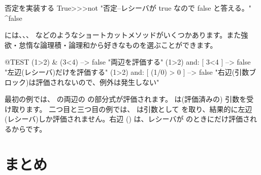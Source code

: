 \documentclass[a4paper,10pt,twoside]{book}
\begin{document}
\begin{method}{否定を実装する}
True>>>not
    "否定--レシーバが true なので false と答える。"
    ^false
\end{method}

 には、、、 などのようなショートカットメソッドがいくつかあります。また強欲・怠惰な論理積・論理和から好きなものを選ぶことができます。

\begin{code}{@TEST}
(1>2) & (3<4)              --> false    "両辺を評価する"
(1>2) and: [ 3<4 ]        --> false    "左辺(レシーバ)だけを評価する"
(1>2) and: [ (1/0) > 0 ] --> false    "右辺(引数ブロック)は評価されないので、例外は発生しない"
\end{code}

最初の例では、 の両辺の  の部分式が評価されます。\ct{&} は(評価済みの)  引数を受け取ります。
二つ目と三つ目の例では、 は引数として  を取り、結果的に左辺(レシーバ)しか評価されません。右辺 () は、レシーバが  のときにだけ評価されるからです。


\section{まとめ}
\end{document}
